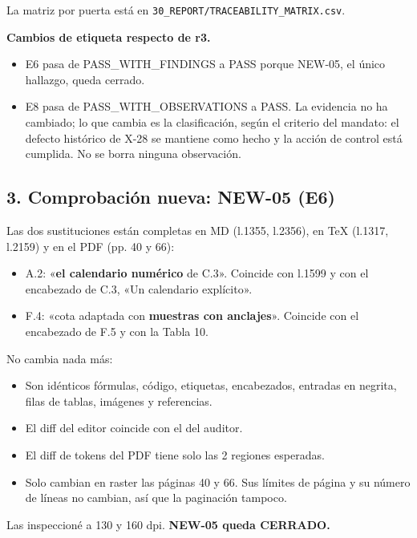\documentclass[
]{article}
\providecommand{\tightlist}{%
  \setlength{\itemsep}{0pt}\setlength{\parskip}{0pt}}
\begin{document}
La matriz por puerta está en
\texttt{30\_REPORT/TRACEABILITY\_MATRIX.csv}.

\textbf{Cambios de etiqueta respecto de r3.}

\begin{itemize}
\tightlist
\item
  E6 pasa de PASS\_WITH\_FINDINGS a PASS porque NEW-05, el único
  hallazgo, queda cerrado.
\item
  E8 pasa de PASS\_WITH\_OBSERVATIONS a PASS. La evidencia no ha
  cambiado; lo que cambia es la clasificación, según el criterio del
  mandato: el defecto histórico de X-28 se mantiene como hecho y la
  acción de control está cumplida. No se borra ninguna observación.
\end{itemize}

\subsection{3. Comprobación nueva: NEW-05
(E6)}\label{3-comprobaciuxf3n-nueva-new-05-e6}

Las dos sustituciones están completas en MD (l.1355, l.2356), en TeX
(l.1317, l.2159) y en el PDF (pp. 40 y 66):

\begin{itemize}
\tightlist
\item
  A.2: «\textbf{el calendario numérico} de C.3». Coincide con l.1599 y
  con el encabezado de C.3, «Un calendario explícito».
\item
  F.4: «cota adaptada con \textbf{muestras con anclajes}». Coincide con
  el encabezado de F.5 y con la Tabla 10.
\end{itemize}

No cambia nada más:

\begin{itemize}
\tightlist
\item
  Son idénticos fórmulas, código, etiquetas, encabezados, entradas en
  negrita, filas de tablas, imágenes y referencias.
\item
  El diff del editor coincide con el del auditor.
\item
  El diff de tokens del PDF tiene solo las 2 regiones esperadas.
\item
  Solo cambian en raster las páginas 40 y 66. Sus límites de página y su
  número de líneas no cambian, así que la paginación tampoco.
\end{itemize}

Las inspeccioné a 130 y 160 dpi. \textbf{NEW-05 queda CERRADO.}
\end{document}
